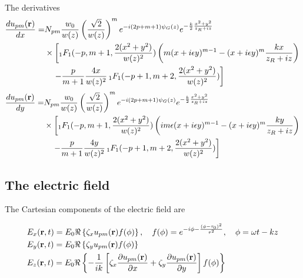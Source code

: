 The derivatives
\begin{align}
    \frac{du_{pm}({\bf r})}{dx}= & N_{pm}\frac{w_0}{w(z)}\left(\frac{\sqrt{2}}{w(z)}\right)^me^{-i(2p + m +1)\psi_G(z)}e^{-\frac{k}2\frac{x^2+y^2}{z_R+i z}}\,\nonumber         \\
                                 & \times\left[_1F_1(-p, m+1, \frac{2(x^2+y^2)}{w(z)^2}) \left(m(x+i\epsilon y)^{m-1}-(x+i\epsilon y)^m\frac{kx}{z_R+iz}\right)\right.\nonumber \\
                                 & \quad\left.-\frac{p}{m+1}\frac{4x}{w(z)^2}\,_1F_1(-p+1, m+2, \frac{2(x^2+y^2)}{w(z)^2})\right]
\end{align}
\begin{align}
    \frac{du_{pm}({\bf r})}{dy}= & N_{pm}\frac{w_0}{w(z)}\left(\frac{\sqrt{2}}{w(z)}\right)^me^{-i(2p + m +1)\psi_G(z)}e^{-\frac{k}2\frac{x^2+y^2}{z_R+i z}}\,\nonumber                  \\
                                 & \times\left[_1F_1(-p, m+1, \frac{2(x^2+y^2)}{w(z)^2}) \left(im\epsilon(x+i\epsilon y)^{m-1}-(x+i\epsilon y)^m\frac{ky}{z_R+iz}\right)\right.\nonumber \\
                                 & \quad\left.-\frac{p}{m+1}\frac{4y}{w(z)^2}\,_1F_1(-p+1, m+2, \frac{2(x^2+y^2)}{w(z)^2})\right]
\end{align}
\subsection{The electric field}
The Cartesian components of the electric field are
\begin{highlightbox}[title={Cartesian electric field}]
    \begin{align}
         & E_x({\bf r},t) = E_0\Re\left\{\zeta_x u_{pm}({\bf r})f(\phi)\right\},\quad f(\phi)=e^{-i\phi-\frac{(\phi -  \tau_0)^2 }{\tau^2}},\quad \phi = \omega t-kz                  \\
         & E_y({\bf r},t) = E_0\Re\left\{\zeta_y u_{pm}({\bf r})f(\phi)\right\}                                                                                                       \\
         & E_z({\bf r},t) = E_0\Re\left\{-\frac1{ik}\left[\zeta_x\frac{\partial u_{pm}({\bf r})}{\partial x}+\zeta_y\frac{\partial u_{pm}({\bf r})}{\partial y}\right]f(\phi)\right\}
    \end{align}
\end{highlightbox}

